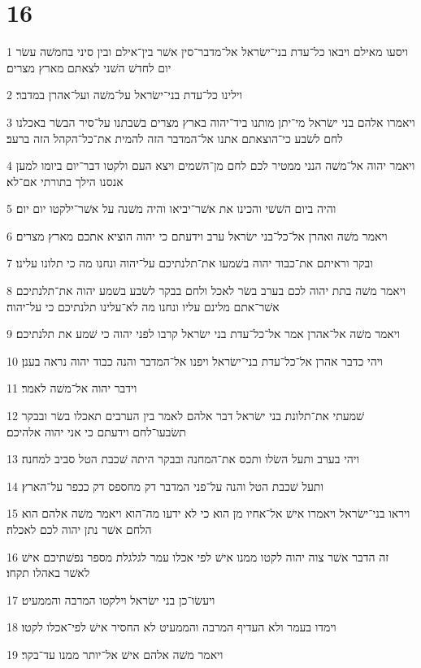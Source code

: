 \chapter{16}

\par 1 ויסעו מאילם ויבאו כל־עדת בני־ישׂראל אל־מדבר־סין אשׁר בין־אילם ובין סיני בחמשׁה עשׂר יום לחדשׁ השׁני לצאתם מארץ מצרים׃
\par 2 וילינו כל־עדת בני־ישׂראל על־משׁה ועל־אהרן במדבר׃
\par 3 ויאמרו אלהם בני ישׂראל מי־יתן מותנו ביד־יהוה בארץ מצרים בשׁבתנו על־סיר הבשׂר באכלנו לחם לשׂבע כי־הוצאתם אתנו אל־המדבר הזה להמית את־כל־הקהל הזה ברעב׃
\par 4 ויאמר יהוה אל־משׁה הנני ממטיר לכם לחם מן־השׁמים ויצא העם ולקטו דבר־יום ביומו למען אנסנו הילך בתורתי אם־לא׃
\par 5 והיה ביום השׁשׁי והכינו את אשׁר־יביאו והיה משׁנה על אשׁר־ילקטו יום יום׃
\par 6 ויאמר משׁה ואהרן אל־כל־בני ישׂראל ערב וידעתם כי יהוה הוציא אתכם מארץ מצרים׃
\par 7 ובקר וראיתם את־כבוד יהוה בשׁמעו את־תלנתיכם על־יהוה ונחנו מה כי תלונו עלינו׃
\par 8 ויאמר משׁה בתת יהוה לכם בערב בשׂר לאכל ולחם בבקר לשׂבע בשׁמע יהוה את־תלנתיכם אשׁר־אתם מלינם עליו ונחנו מה לא־עלינו תלנתיכם כי על־יהוה׃
\par 9 ויאמר משׁה אל־אהרן אמר אל־כל־עדת בני ישׂראל קרבו לפני יהוה כי שׁמע את תלנתיכם׃
\par 10 ויהי כדבר אהרן אל־כל־עדת בני־ישׂראל ויפנו אל־המדבר והנה כבוד יהוה נראה בענן׃
\par 11 וידבר יהוה אל־משׁה לאמר׃
\par 12 שׁמעתי את־תלונת בני ישׂראל דבר אלהם לאמר בין הערבים תאכלו בשׂר ובבקר תשׂבעו־לחם וידעתם כי אני יהוה אלהיכם׃
\par 13 ויהי בערב ותעל השׂלו ותכס את־המחנה ובבקר היתה שׁכבת הטל סביב למחנה׃
\par 14 ותעל שׁכבת הטל והנה על־פני המדבר דק מחספס דק ככפר על־הארץ׃
\par 15 ויראו בני־ישׂראל ויאמרו אישׁ אל־אחיו מן הוא כי לא ידעו מה־הוא ויאמר משׁה אלהם הוא הלחם אשׁר נתן יהוה לכם לאכלה׃
\par 16 זה הדבר אשׁר צוה יהוה לקטו ממנו אישׁ לפי אכלו עמר לגלגלת מספר נפשׁתיכם אישׁ לאשׁר באהלו תקחו׃
\par 17 ויעשׂו־כן בני ישׂראל וילקטו המרבה והממעיט׃
\par 18 וימדו בעמר ולא העדיף המרבה והממעיט לא החסיר אישׁ לפי־אכלו לקטו׃
\par 19 ויאמר משׁה אלהם אישׁ אל־יותר ממנו עד־בקר׃
